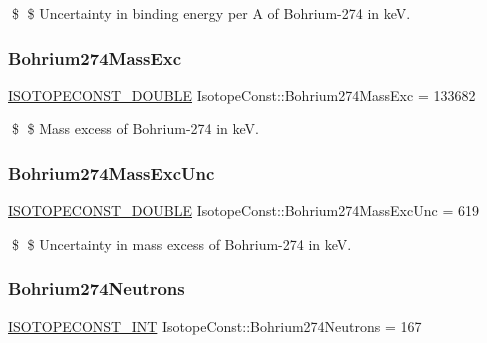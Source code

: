 \$ \$ Uncertainty in binding energy per A of Bohrium-\/274 in keV. \mbox{\label{group___isotope_const-_bohrium-_bh274_ga08c4fbcbe0bc7d0f64fc4e1334bc759c}} 
\subsubsection{\texorpdfstring{Bohrium274\+Mass\+Exc}{Bohrium274MassExc}}
{\footnotesize\ttfamily \mbox{\hyperlink{group___isotope_const-_macros_ga8f45a7272ce02c0b4c65c44636ed719a}{I\+S\+O\+T\+O\+P\+E\+C\+O\+N\+S\+T\+\_\+\+D\+O\+U\+B\+LE}} Isotope\+Const\+::\+Bohrium274\+Mass\+Exc = 133682}

\$ \$ Mass excess of Bohrium-\/274 in keV. \mbox{\label{group___isotope_const-_bohrium-_bh274_gaa0bdca50c23599e53c08292c92d09e20}} 
\subsubsection{\texorpdfstring{Bohrium274\+Mass\+Exc\+Unc}{Bohrium274MassExcUnc}}
{\footnotesize\ttfamily \mbox{\hyperlink{group___isotope_const-_macros_ga8f45a7272ce02c0b4c65c44636ed719a}{I\+S\+O\+T\+O\+P\+E\+C\+O\+N\+S\+T\+\_\+\+D\+O\+U\+B\+LE}} Isotope\+Const\+::\+Bohrium274\+Mass\+Exc\+Unc = 619}

\$ \$ Uncertainty in mass excess of Bohrium-\/274 in keV. \mbox{\label{group___isotope_const-_bohrium-_bh274_ga93df4617e5ce6229b935ad4705cdb9c3}} 
\subsubsection{\texorpdfstring{Bohrium274\+Neutrons}{Bohrium274Neutrons}}
{\footnotesize\ttfamily \mbox{\hyperlink{group___isotope_const-_macros_ga5f18360b3e99483a35c32d789e62621c}{I\+S\+O\+T\+O\+P\+E\+C\+O\+N\+S\+T\+\_\+\+I\+NT}} Isotope\+Const\+::\+Bohrium274\+Neutrons = 167}

